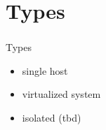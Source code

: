 \section{Types}
%
\begin{frame}
\frametitle{}
%
{\LARGE Types \newline}
\begin{itemize}
  \item single host
  \item virtualized system
  \item isolated (tbd)
\end{itemize}
\end{frame}
